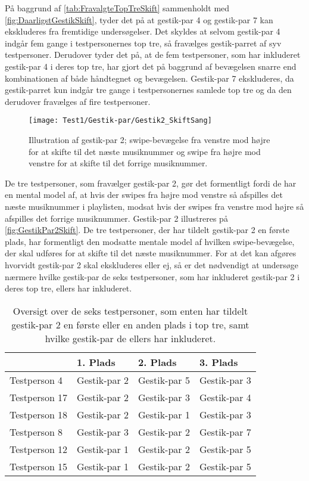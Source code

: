 \noindent
%
På baggrund af \autoref{tab:FravalgteTopTreSkift} sammenholdt med \autoref{fig:DaarligstGestikSkift}, tyder det på at gestik-par 4 og gestik-par 7 kan ekskluderes fra fremtidige undersøgelser. Det skyldes at selvom gestik-par 4 indgår fem gange i testpersonernes top tre, så fravælges gestik-parret af syv testpersoner. Derudover tyder det på, at de fem testpersoner, som har inkluderet gestik-par 4 i deres top tre, har gjort det på baggrund af bevægelsen snarre end kombinationen af både håndtegnet og bevægelsen. Gestik-par 7 ekskluderes, da gestik-parret kun indgår tre gange i testpersonernes samlede top tre og da den derudover fravælges af fire testpersoner. 
%
\begin{figure}[H]
	\centering
	\texttt{[image: Test1/Gestik-par/Gestik2\_SkiftSang]}
	\caption{Illustration af gestik-par 2; swipe-bevægelse fra venstre mod højre for at skifte til det næste musiknummer og swipe fra højre mod venstre for at skifte til det forrige musiknummer.}
	\label{fig:GestikPar2Skift}
\end{figure}
\noindent
%
De tre testpersoner, som fravælger gestik-par 2, gør det formentligt fordi de har en mental model af, at hvis der swipes fra højre mod venstre så afspilles det næste musiknummer i playlisten, modsat hvis der swipes fra venstre mod højre så afspilles det forrige musiknummer. Gestik-par 2 illustreres på \autoref{fig:GestikPar2Skift}. De tre testpersoner, der har tildelt gestik-par 2 en første plads, har formentligt den modsatte mentale model af hvilken swipe-bevægelse, der skal udføres for at skifte til det næste musiknummer. For at det kan afgøres hvorvidt gestik-par 2 skal ekskluderes eller ej, så er det nødvendigt at undersøge nærmere hvilke gestik-par de seks testpersoner, som har inkluderet gestik-par 2 i deres top tre, ellers har inkluderet. 
%
\begin{table}[H]
	\centering
	\begin{tabular}{ | p{3cm} | p{3cm} | p{3cm} | p{3cm} |}
	\hline
		 & 1. Plads & 2. Plads & 3. Plads \\ \hline
		Testperson 4 & Gestik-par 2 & Gestik-par 5 & Gestik-par 3 \\ \hline
		Testperson 17 & Gestik-par 2 & Gestik-par 3 & Gestik-par 4 \\ \hline
		Testperson 18 & Gestik-par 2 & Gestik-par 1 & Gestik-par 3 \\ \hline
		Testperson 8 & Gestik-par 3 & Gestik-par 2 & Gestik-par 7 \\ \hline
		Testperson 12 & Gestik-par 1 & Gestik-par 2 & Gestik-par 5\\ \hline
		Testperson 15 & Gestik-par 1 & Gestik-par 2 & Gestik-par 5 \\ \hline
	\end{tabular}
	\caption{Oversigt over de seks testpersoner, som enten har tildelt gestik-par 2 en første eller en anden plads i top tre, samt hvilke gestik-par de ellers har inkluderet.}
	\label{tab:GestikPar2ITopTre}
\end{table}
